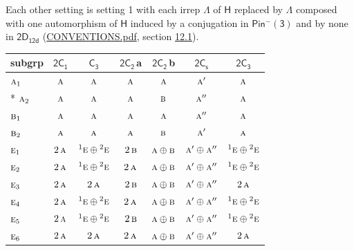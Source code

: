 \documentclass[10pt,a4paper]{article}
\numberwithin{equation}{section}
\newcommand{\grp}[1]{\mathsf{#1}}
\newcommand{\irr}[1]{\text{\normalfont\scshape #1}}
\newcommand{\conjpair}[1]{{}^{#1}}
\newcommand{\clsletter}[1]{\,{\scriptsize\color{black!55}#1}}
\begin{document}
\label{n:irrep.Delta}Each other setting is setting 1 with each irrep $\Lambda$ of $\grp{H}$ replaced by $\Lambda$ composed with one automorphism of $\grp{H}$ induced by a conjugation in \href{Pinminus3.pdf}{$\grp{Pin^{-}(3)}$} and by none in $\grp{2D_{12d}}$ (\href{../../CONVENTIONS.pdf}{CONVENTIONS.pdf}, section \href{../../../rotation/CONVENTIONS.pdf\#conv.12.1}{12.1}).
{\small\begin{longtable}{@{}lcccccc@{}}\toprule
subgrp & \href{2C1.pdf}{$\grp{2C_{1}}$} & \href{C3.pdf}{$\grp{C_{3}}$} & \href{2C2.pdf}{$\grp{2C_{2}}$}\clsletter{a} & \href{2C2.pdf}{$\grp{2C_{2}}$}\clsletter{b} & \href{2C1v.pdf}{$\grp{2C_{s}}$} & \href{2C3.pdf}{$\grp{2C_{3}}$}\\\midrule\endhead
\bottomrule\endfoot\endlastfoot
$\irr{a}_{1}$ & $\irr{a}$ & $\irr{a}$ & $\irr{a}$ & $\irr{a}$ & $\irr{a}'$ & $\irr{a}$\\*
$\irr{a}_{2}$ & $\irr{a}$ & $\irr{a}$ & $\irr{a}$ & $\irr{b}$ & $\irr{a}''$ & $\irr{a}$\\
$\irr{b}_{1}$ & $\irr{a}$ & $\irr{a}$ & $\irr{a}$ & $\irr{a}$ & $\irr{a}''$ & $\irr{a}$\\
$\irr{b}_{2}$ & $\irr{a}$ & $\irr{a}$ & $\irr{a}$ & $\irr{b}$ & $\irr{a}'$ & $\irr{a}$\\
$\irr{e}_{1}$ & $2\,\irr{a}$ & $\conjpair{1}\irr{e}\oplus \conjpair{2}\irr{e}$ & $2\,\irr{b}$ & $\irr{a}\oplus \irr{b}$ & $\irr{a}'\oplus \irr{a}''$ & $\conjpair{1}\irr{e}\oplus \conjpair{2}\irr{e}$\\
$\irr{e}_{2}$ & $2\,\irr{a}$ & $\conjpair{1}\irr{e}\oplus \conjpair{2}\irr{e}$ & $2\,\irr{a}$ & $\irr{a}\oplus \irr{b}$ & $\irr{a}'\oplus \irr{a}''$ & $\conjpair{1}\irr{e}\oplus \conjpair{2}\irr{e}$\\
$\irr{e}_{3}$ & $2\,\irr{a}$ & $2\,\irr{a}$ & $2\,\irr{b}$ & $\irr{a}\oplus \irr{b}$ & $\irr{a}'\oplus \irr{a}''$ & $2\,\irr{a}$\\
$\irr{e}_{4}$ & $2\,\irr{a}$ & $\conjpair{1}\irr{e}\oplus \conjpair{2}\irr{e}$ & $2\,\irr{a}$ & $\irr{a}\oplus \irr{b}$ & $\irr{a}'\oplus \irr{a}''$ & $\conjpair{1}\irr{e}\oplus \conjpair{2}\irr{e}$\\
$\irr{e}_{5}$ & $2\,\irr{a}$ & $\conjpair{1}\irr{e}\oplus \conjpair{2}\irr{e}$ & $2\,\irr{b}$ & $\irr{a}\oplus \irr{b}$ & $\irr{a}'\oplus \irr{a}''$ & $\conjpair{1}\irr{e}\oplus \conjpair{2}\irr{e}$\\
$\irr{e}_{6}$ & $2\,\irr{a}$ & $2\,\irr{a}$ & $2\,\irr{a}$ & $\irr{a}\oplus \irr{b}$ & $\irr{a}'\oplus \irr{a}''$ & $2\,\irr{a}$\\

\end{longtable}}
\end{document}
